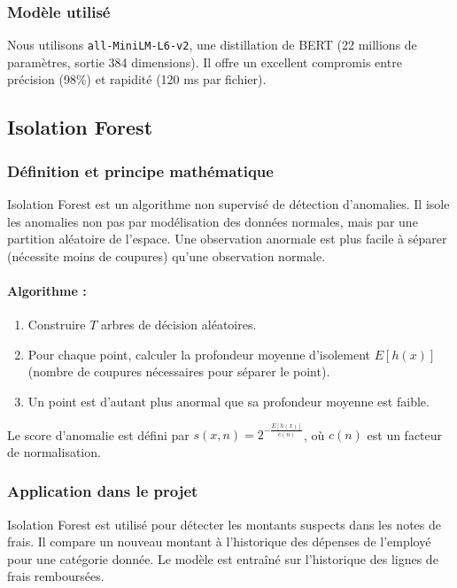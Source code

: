 \documentclass[12pt,a4paper]{report}
\begin{document}
\subsubsection{Modèle utilisé}

Nous utilisons \texttt{all-MiniLM-L6-v2}, une distillation de BERT (22 millions de paramètres, sortie 384 dimensions). Il offre un excellent compromis entre précision (98\%) et rapidité (120 ms par fichier).

\subsection{Isolation Forest}

\subsubsection{Définition et principe mathématique}

Isolation Forest est un algorithme non supervisé de détection d'anomalies. Il isole les anomalies non pas par modélisation des données normales, mais par une partition aléatoire de l’espace. Une observation anormale est plus facile à séparer (nécessite moins de coupures) qu’une observation normale.

\paragraph{Algorithme :}
\begin{enumerate}
 \item Construire $T$ arbres de décision aléatoires.
 \item Pour chaque point, calculer la profondeur moyenne d’isolement $E[h(x)]$ (nombre de coupures nécessaires pour séparer le point).
 \item Un point est d’autant plus anormal que sa profondeur moyenne est faible.
\end{enumerate}
Le score d’anomalie est défini par $s(x,n) = 2^{-\frac{E[h(x)]}{c(n)}}$, où $c(n)$ est un facteur de normalisation.

\subsubsection{Application dans le projet}

Isolation Forest est utilisé pour détecter les montants suspects dans les notes de frais. Il compare un nouveau montant à l’historique des dépenses de l’employé pour une catégorie donnée. Le modèle est entraîné sur l’historique des lignes de frais remboursées.
\end{document}
